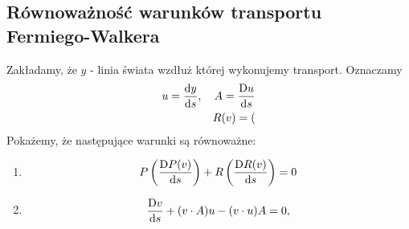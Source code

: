 \subsection{Równoważność warunków transportu 
Fermiego-Walkera}
Zakładamy, że $y$ - linia świata wzdłuż której 
wykonujemy transport. Oznaczamy
\begin{align}
u = \frac{\text{d} y}{\text{d} s}, \quad A = \frac{\text{D} u}{\text{d} s} \\
R(v) = (
\end{align}
Pokażemy, że następujące warunki są równoważne:
\begin{enumerate}
\item
\begin{align} 
P \left(\frac{\text{D} P(v)}{\text{d} s} \right) +
R \left( \frac{\text{D} R(v)}{\text{d} s} \right) = 0
\end{align}
\item
\begin{align} 
 \frac{\text{D} v}{\text{d} s} +
(v\cdot A) u - (v\cdot u) A = 0,
\end{align}
\end{enumerate}



